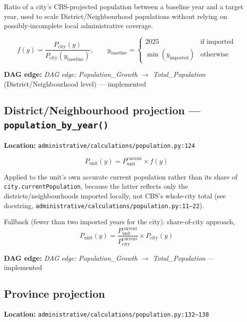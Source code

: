 \documentclass[11pt]{article}
\newcommand{\code}[1]{\texttt{#1}}
\newcommand{\dagedge}[1]{\textit{DAG edge: #1}}
\newcommand{\statusdone}{\textcolor{green!50!black}{implemented}}
\begin{document}
Ratio of a city's CBS-projected population between a baseline year and a target year, used to scale District/Neighbourhood populations without relying on possibly-incomplete local administrative coverage.

\begin{equation}
  f(y) = \frac{P_{\text{city}}(y)}{P_{\text{city}}(y_{\text{baseline}})}, \qquad
  y_{\text{baseline}} = \begin{cases} 2025 & \text{if imported} \\ \min(y_{\text{imported}}) & \text{otherwise} \end{cases}
\end{equation}

\textbf{DAG edge:} \dagedge{Population\_Growth $\rightarrow$ Total\_Population} (District/Neighbourhood level) --- \statusdone{}

\subsection{District/Neighbourhood projection --- \code{population\_by\_year()}}
\textbf{Location:} \code{administrative/calculations/population.py:124}

\begin{equation}
  P_{\text{unit}}(y) = P_{\text{unit}}^{\text{current}} \times f(y)
\end{equation}

Applied to the unit's own accurate current population rather than its share of \code{city.currentPopulation}, because the latter reflects only the districts/neighbourhoods imported locally, not CBS's whole-city total (see docstring, \code{administrative/calculations/population.py:11--22}).

Fallback (fewer than two imported years for the city): share-of-city approach,
\begin{equation}
  P_{\text{unit}}(y) = \frac{P_{\text{unit}}^{\text{current}}}{P_{\text{city}}^{\text{current}}} \times P_{\text{city}}(y)
\end{equation}

\textbf{DAG edge:} \dagedge{Population\_Growth $\rightarrow$ Total\_Population} --- \statusdone{}

\subsection{Province projection}
\textbf{Location:} \code{administrative/calculations/population.py:132--138}
\end{document}
